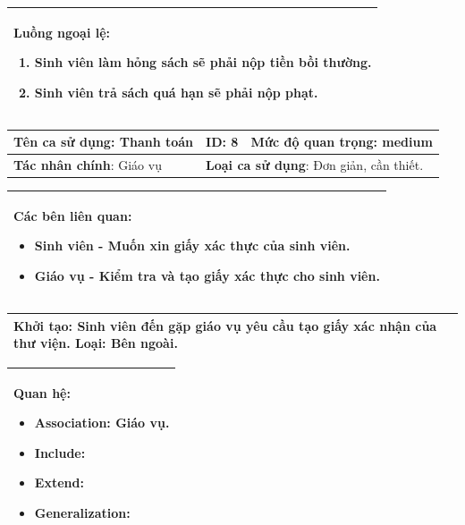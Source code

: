 \documentclass[12pt]{report}
\begin{document}
\begin{center}
\begin{tabular}{| m{15.9cm} |}
    \hline
    \textbf{Luồng ngoại lệ}:
    \begin{enumerate}
        \item Sinh viên làm hỏng sách sẽ phải nộp tiền bồi thường. 
        \item Sinh viên trả sách quá hạn sẽ phải nộp phạt. 
    \end{enumerate} \\
    \hline
\end{tabular}

\newpage
\begin{tabular}{| m{6cm} | m{3cm} | m{6cm} |}
    \hline
    \textbf{Tên ca sử dụng}: Thanh toán & \textbf{ID}: 8 & \textbf{Mức độ quan trọng}: medium \\
    \hline
    \textbf{Tác nhân chính}: Giáo vụ  & \multicolumn{2}{|l|}{\textbf{Loại ca sử dụng}: Đơn giản, cần thiết.} \\
    \hline
\end{tabular}
\begin{tabular}{| m{15.9cm} |}
    \hline
        \textbf{Các bên liên quan:} 
        \begin{itemize}
            \item Sinh viên - Muốn xin giấy xác thực của sinh viên. 
            \item Giáo vụ - Kiểm tra và tạo giấy xác thực cho sinh viên. 
        \end{itemize} \\
    \hline
\end{tabular}

\begin{tabular}{| m{15.9cm} |}
    \hline
    \textbf{Khởi tạo}: Sinh viên đến gặp giáo vụ yêu cầu tạo giấy xác nhận của thư viện. 
    \textbf{Loại}: Bên ngoài.  \\
    \hline
\end{tabular}

\begin{tabular}{| m{15.9cm} |}
    \hline
    \textbf{Quan hệ}:
    \begin{itemize}
        \item Association: Giáo vụ. 
        \item Include: 
        \item Extend: 
        \item Generalization: 
    \end{itemize} \\
    \hline
\end{tabular}


\end{center}
\end{document}
